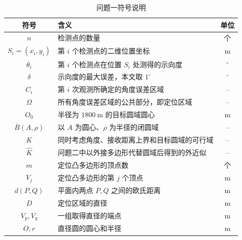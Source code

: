 \documentclass[withoutpreface,bwprint]{cumcmthesis}
\begin{document}
\begin{table}[H]
  \centering
  \caption{问题一符号说明}
  \label{tab:symbols}
  \begin{tabularx}{0.9\textwidth}{@{}cXc@{}}
    \toprule
    符号 & 含义 & 单位 \\
    \midrule
    $n$ & 检测点的数量 & 个 \\
    $S_i=(x_i,y_i)$ & 第 $i$ 个检测点的二维位置坐标 & $\mathrm{m}$ \\
    $\theta_i$ & 第 $i$ 个检测点在位置 $S_i$ 处测得的示向度 & $^\circ$ \\
    $\delta$ & 示向度的最大误差，本文取 $1^\circ$ & $^\circ$ \\
    $C_i$ & 第 $i$ 次观测所确定的角度误差区域 & -- \\
    $\Omega$ & 所有角度误差区域的公共部分，即定位区域 & -- \\
    $O_0$ & 半径为 $1800\ \mathrm{m}$ 的目标圆域圆心 & m \\
    $\overline B(A,\rho)$ & 以 $A$ 为圆心、$\rho$ 为半径的闭圆域 & -- \\
    $K$ & 同时考虑角度、接收距离上界和目标圆域的可行域 & -- \\
    $\widehat K$ & 问题二中以外接多边形代替圆域后得到的外近似 & -- \\
    $m$ & 定位凸多边形的顶点数 & 个 \\
    $V_j$ & 定位凸多边形的第 $j$ 个顶点 & m \\
    $d(P,Q)$ & 平面内两点 $P,Q$ 之间的欧氏距离 & m \\
    $D$ & 定位区域的直径 & m \\
    $V_p,V_q$ & 一组取得直径的端点 & m \\
    $O,r$ & 直径圆的圆心和半径 & m \\
    \bottomrule
  \end{tabularx}
\end{table}
\end{document}
